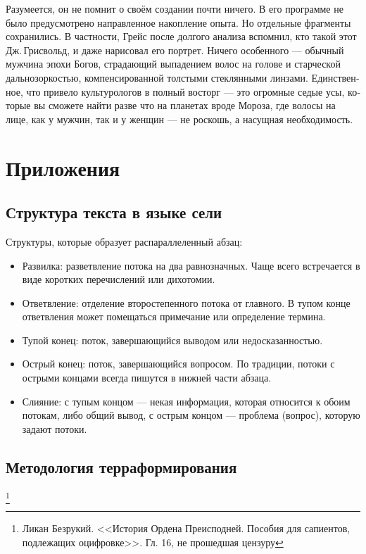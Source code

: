 \documentclass[a4paper,12pt,fleqn]{book}\usepackage{cooltooltips}\usepackage{polyglossia}\setdefaultlanguage[babelshorthands=true]{russian}\setotherlanguage{english}\defaultfontfeatures{Ligatures=TeX,Mapping=tex-text} \usepackage{xcolor}\definecolor{lightgray}{HTML}{bbbbbb}\color{lightgray}\newcommand{\ml}[3]{\textenglish{\textcolor{black}{#3}}}
\begin{document}
{Разумеется, он не помнит о своём создании почти ничего.
В его программе не было предусмотрено направленное накопление опыта.
Но отдельные фрагменты сохранились.
В частности, Грейс после долгого анализа вспомнил, кто такой этот Дж.\,Грисвольд, и даже нарисовал его портрет.
Ничего особенного --- обычный мужчина эпохи Богов, страдающий выпадением волос на голове и старческой дальнозоркостью, компенсированной толстыми стеклянными линзами.
Единственное, что привело культурологов в полный восторг --- это огромные седые усы, которые вы сможете найти разве что на планетах вроде Мороза, где волосы на лице, как у мужчин, так и у женщин --- не роскошь, а насущная необходимость.

\chapter{Приложения}

\section{Структура текста в языке сели}

Структуры, которые образует распараллеленный абзац:

\begin{itemize}
\item Развилка: разветвление потока на два равнозначных.
Чаще всего встречается в виде коротких перечислений или дихотомии.
\item Ответвление: отделение второстепенного потока от главного.
В тупом конце ответвления может помещаться примечание или определение термина.
\item Тупой конец: поток, завершающийся выводом или недосказанностью.
\item Острый конец: поток, завершающийся вопросом. По традиции, потоки с острыми концами всегда пишутся в нижней части абзаца.
\item Слияние: с тупым концом --- некая информация, которая относится к обоим потокам, либо общий вывод, с острым концом --- проблема (вопрос), которую задают потоки.
\end{itemize}

\section{Методология терраформирования}

\footnote{Ликан Безрукий. <<История Ордена Преисподней. Пособия для сапиентов, подлежащих оцифровке>>. Гл. 16, не прошедшая цензуру}

}
\end{document}
